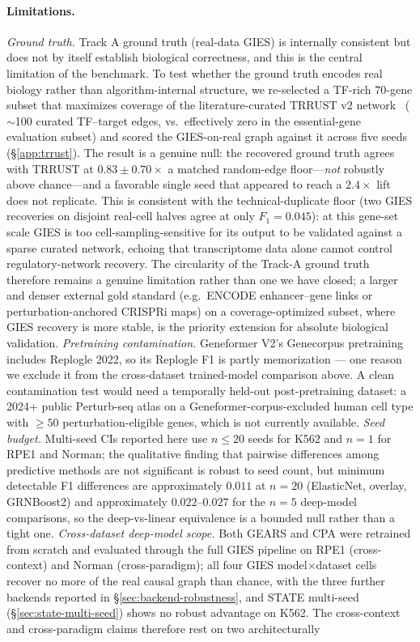 \documentclass{article}
\theoremstyle{plain}
\theoremstyle{definition}
\theoremstyle{remark}
\begin{document}
\paragraph{Limitations.}
\label{sec:limitations}
\textit{Ground truth.} Track A ground truth (real-data GIES) is internally consistent but does not by itself establish biological correctness, and this is the central limitation of the benchmark. To test whether the ground truth encodes real biology rather than algorithm-internal structure, we re-selected a TF-rich 70-gene subset that maximizes coverage of the literature-curated TRRUST v2 network~\citep{han2018trrust} ($\sim$100 curated TF--target edges, vs.\ effectively zero in the essential-gene evaluation subset) and scored the GIES-on-real graph against it across five seeds (\S\ref{app:trrust}). The result is a genuine null: the recovered ground truth agrees with TRRUST at $0.83 \pm 0.70\times$ a matched random-edge floor---\emph{not} robustly above chance---and a favorable single seed that appeared to reach a $2.4\times$ lift does not replicate. This is consistent with the technical-duplicate floor (two GIES recoveries on disjoint real-cell halves agree at only $F_1 = 0.045$): at this gene-set scale GIES is too cell-sampling-sensitive for its output to be validated against a sparse curated network, echoing \citet{kernfeld2024fdr} that transcriptome data alone cannot control regulatory-network recovery. The circularity of the Track-A ground truth therefore remains a genuine limitation rather than one we have closed; a larger and denser external gold standard (e.g.\ ENCODE enhancer--gene links or perturbation-anchored CRISPRi maps) on a coverage-optimized subset, where GIES recovery is more stable, is the priority extension for absolute biological validation. \textit{Pretraining contamination.} Geneformer V2's Genecorpus pretraining includes Replogle 2022, so its Replogle F1 is partly memorization --- one reason we exclude it from the cross-dataset trained-model comparison above. A clean contamination test would need a temporally held-out post-pretraining dataset: a 2024+ public Perturb-seq atlas on a Geneformer-corpus-excluded human cell type with $\geq 50$ perturbation-eligible genes, which is not currently available. \textit{Seed budget.} Multi-seed CIs reported here use $n \leq 20$ seeds for K562 and $n=1$ for RPE1 and Norman; the qualitative finding that pairwise differences among predictive methods are not significant is robust to seed count, but minimum detectable F1 differences are approximately $0.011$ at $n=20$ (ElasticNet, overlay, GRNBoost2) and approximately $0.022$--$0.027$ for the $n=5$ deep-model comparisons, so the deep-vs-linear equivalence is a bounded null rather than a tight one. \textit{Cross-dataset deep-model scope.} Both GEARS and CPA were retrained from scratch and evaluated through the full GIES pipeline on RPE1 (cross-context) and Norman (cross-paradigm); all four GIES model$\times$dataset cells recover no more of the real causal graph than chance, with the three further backends reported in \S\ref{sec:backend-robustness}, and STATE multi-seed (\S\ref{sec:state-multi-seed}) shows no robust advantage on K562. The cross-context and cross-paradigm claims therefore rest on two architecturally 
\end{document}
